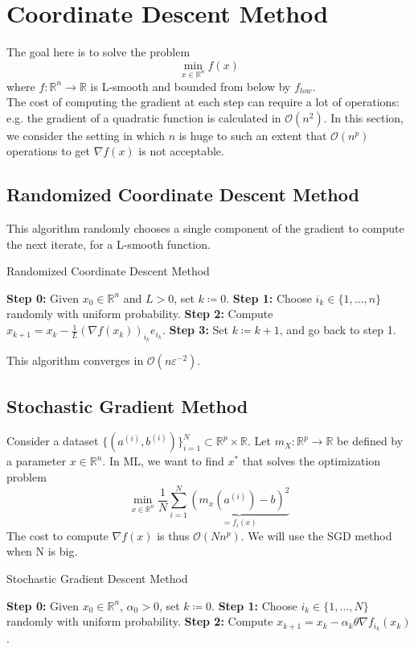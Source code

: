 \documentclass[12pt, openany]{report}
\newcommand{\R}{\mathbb{R}}
\theoremstyle{definition}
\begin{document}
\chapter{Coordinate Descent Method}
The goal here is to solve the problem
\begin{equation}
    \min_{x\in \R^n}f(x) 
\end{equation}
where \(f:\R^n\rightarrow \R\) is L-smooth and bounded from below by \(f_{low}\).\\

The cost of computing the gradient at each step can require a lot of operations: e.g. the gradient of a quadratic function is calculated in \(\mathcal{O}(n^2)\). In this section, we consider the setting in which \(n\) is huge to such an extent that \(\mathcal{O}(n^p)\) operations to get \(\nabla f(x)\) is not acceptable. 
\section{Randomized Coordinate Descent Method}
This algorithm randomly chooses a single component of the gradient to compute the next iterate, for a L-smooth function.
\begin{algorithm}\label{algo:random_CDM}
    \caption{Randomized Coordinate Descent Method}
    \begin{algorithmic}[1]
    \State \textbf{Step 0:} Given $x_0 \in \mathbb{R}^n$ and $L > 0$, set $k \coloneqq 0$.
    \State \textbf{Step 1:} Choose \(i_k\in \{1,\dots,n\}\) randomly with uniform probability. 
    \State \textbf{Step 2:} Compute $x_{k+1} = x_k - \frac{1}{L}\left(\nabla f(x_k)\right)_{i_k}e_{i_k}$.
    \State \textbf{Step 3:} Set \(k\coloneqq k+1\), and go back to step 1.
    \end{algorithmic}
\end{algorithm}
This algorithm converges in \(\mathcal{O}(n\varepsilon^{-2})\). 
\section{Stochastic Gradient Method}
Consider a dataset \(\{(a^{(i)},b^{(i)})\}_{i=1}^N\subset \R^p\times \R\). Let \(m_X:\R^p\rightarrow \R\) be defined by a parameter \(x\in \R^n\). In ML, we want to find \(x^*\) that solves the optimization problem
\begin{equation}
    \min_{x\in \R^n}\frac{1}{N}\sum_{i=1}^N \underbrace{\left(m_x\left(a^{(i)}\right)-b\right)^2}_{=f_i(x)}
\end{equation}
The cost to compute \(\nabla f(x)\) is thus \(\mathcal{O}(Nn^p)\). We will use the SGD method when N is big.
\begin{algorithm}\label{algo:SGD}
    \caption{Stochastic Gradient Descent Method}
    \begin{algorithmic}[1]
        \State \textbf{Step 0:} Given \(x_0\in \R^n\), \(\alpha_0>0\), set \(k\coloneqq 0\).
        \State \textbf{Step 1:} Choose \(i_k\in \{1,\dots,N\}\) randomly with uniform probability.
        \State \textbf{Step 2:} Compute \(x_{k+1}=x_k-\alpha_k \theta \nabla f_{i_k}(x_k)\).
    \end{algorithmic}
\end{algorithm}
\end{document}
